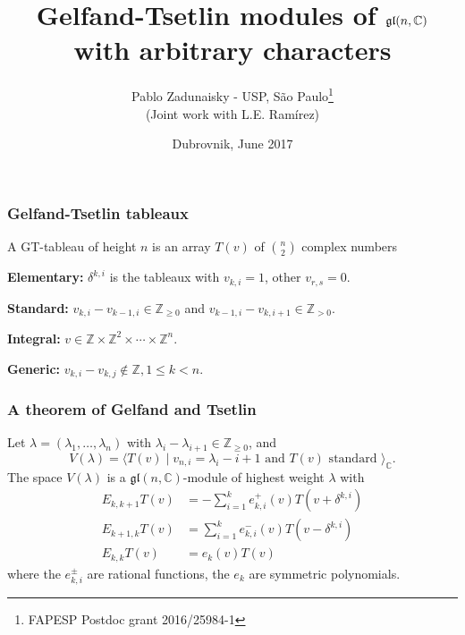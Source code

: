\documentclass[smaller,usepdftitle=false]{beamer}
\title[]{Gelfand-Tsetlin modules of $\gl(n,\CC)$ with arbitrary characters}
\author[]{Pablo Zadunaisky - USP, S\~ao Paulo\footnote{FAPESP Postdoc 
grant 2016/25984-1} \\
(Joint work with L.E. Ramírez)}
\date{Dubrovnik, June 2017}
\newcommand\CC{\mathbb C}
\newcommand\ZZ{\mathbb Z}
\newcommand\gl{\mathfrak{gl}}
\begin{document}

\begin{frame}
\titlepage
\end{frame}


\begin{frame}
\frametitle{Gelfand-Tsetlin tableaux}
A GT-tableau of height $n$ is an array $T(v)$ of $\binom{n}{2}$ complex numbers
\bigskip


\textbf{Elementary:} $\delta^{k,i}$ is the tableaux with $v_{k,i} = 1$, other 
$v_{r,s} = 0$.

\textbf{Standard:} $v_{k,i} - v_{k-1,i} \in \ZZ_{\geq 0}$ and $v_{k-1,i} - 
v_{k,i+1} \in \ZZ_{>0}$.

\textbf{Integral:} $v \in \ZZ \times \ZZ^2 \times \cdots \times \ZZ^n$.

\textbf{Generic:} $v_{k,i} - v_{k,j} \notin \ZZ, 1 \leq k < n$.
\end{frame}

\begin{frame}
\frametitle{A theorem of Gelfand and Tsetlin}

\begin{Theorem}
Let $\lambda = (\lambda_1, \ldots, \lambda_n)$ with $\lambda_i - \lambda_{i+1} 
\in \ZZ_{\geq 0}$, and
$$V(\lambda) = \langle T(v) \mid v_{n,i} = \lambda_i - i + 1 \mbox{ and }
T(v) \mbox{ standard }\rangle_\CC.$$ 
The space $V(\lambda)$ is a $\gl(n,\CC)$-module of highest weight $\lambda$
with
\begin{align*}
E_{k,k+1} T(v) &= - \sum_{i=1}^k e^+_{k,i}(v) T(v+\delta^{k,i}) \\
E_{k+1,k} T(v) &= \sum_{i=1}^k e^-_{k,i}(v) T(v-\delta^{k,i}) \\
E_{k,k} T(v) &= e_k(v) T(v)
\end{align*}
where the $e^\pm_{k,i}$ are rational functions, the $e_k$ are symmetric 
polynomials.
\end{Theorem}
\end{frame}
\end{document}
